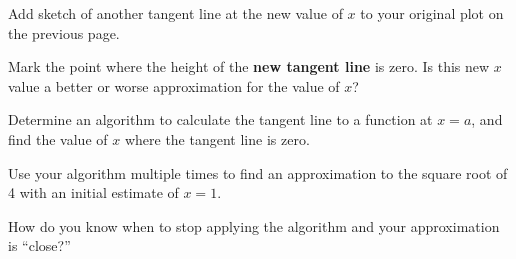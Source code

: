 \begin{problem}
\begin{subproblem}
  \item Add sketch of another tangent line at the new value of $x$ to
    your original plot on the previous page.

  \item Mark the point where the height of the \textbf{new tangent line}
    is zero. Is this new $x$ value a better or worse approximation for
    the value of $x$?


  \end{subproblem}

  \clearpage

\item Determine an algorithm to calculate the tangent line to a
  function at $x=a$, and find the value of $x$ where the tangent line
  is zero.

  \vfill

\clearpage

\item Use your algorithm multiple times to find an approximation to
  the square root of 4 with an initial estimate of $x=1$.

  \vfill

\item How do you know when to stop applying the algorithm and your
  approximation is ``close?''

\end{problem}


\postClass

